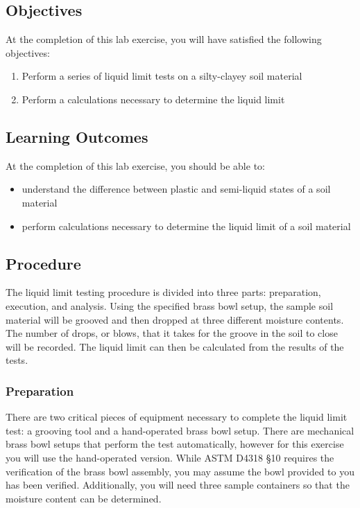 \documentclass[12pt]{article}
\begin{document}
\subsection{Objectives}
At the completion of this lab exercise, you will have satisfied the following objectives:
\begin{enumerate}
    \item Perform a series of liquid limit tests on a silty-clayey soil material
    \item Perform a calculations necessary to determine the liquid limit
\end{enumerate}

\subsection{Learning Outcomes}
At the completion of this lab exercise, you should be able to:
\begin{itemize}
    \item understand the difference between plastic and semi-liquid states of a soil material
    \item perform calculations necessary to determine the liquid limit of a soil material
\end{itemize}

\pagebreak
\subsection{Procedure}
The liquid limit testing procedure is divided into three parts: preparation, execution, and analysis. Using the specified brass bowl setup, the sample soil material will be grooved and then dropped at three different moisture contents. The number of drops, or blows, that it takes for the groove in the soil to close will be recorded. The liquid limit can then be calculated from the results of the tests.

\subsubsection{Preparation}
There are two critical pieces of equipment necessary to complete the liquid limit test: a grooving tool and a hand-operated brass bowl setup. There are mechanical brass bowl setups that perform the test automatically, however for this exercise you will use the hand-operated version. While ASTM D4318 \S10 requires the verification of the brass bowl assembly, you may assume the bowl provided to you has been verified. Additionally, you will need three sample containers so that the moisture content can be determined. 
\end{document}
